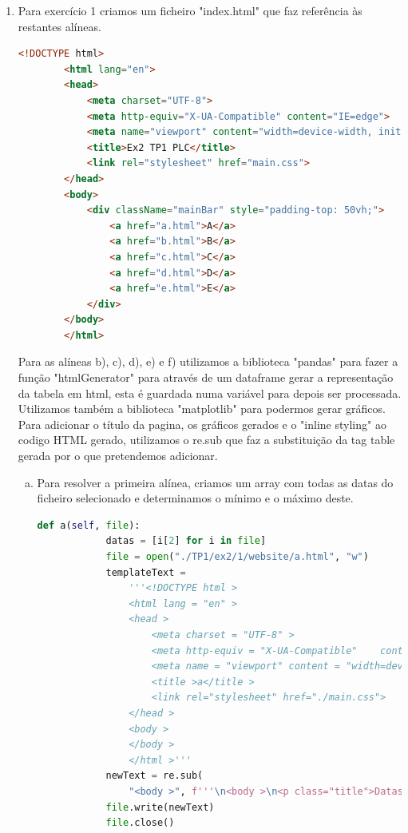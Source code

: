 \documentclass[11pt,a4paper]{report}%
\begin{document}
\begin{enumerate}
	\item Para exercício 1 criamos um ficheiro "index.html" que faz referência às restantes alíneas.\\
	\begin{lstlisting}[language=html]
		<!DOCTYPE html>
		<html lang="en">
		<head>
			<meta charset="UTF-8">
			<meta http-equiv="X-UA-Compatible" content="IE=edge">
			<meta name="viewport" content="width=device-width, initial-scale=1.0">
			<title>Ex2 TP1 PLC</title>
			<link rel="stylesheet" href="main.css">
		</head>
		<body>
			<div className="mainBar" style="padding-top: 50vh;">
				<a href="a.html">A</a>
				<a href="b.html">B</a>
				<a href="c.html">C</a>
				<a href="d.html">D</a>
				<a href="e.html">E</a>
			</div>
		</body>
		</html>
	\end{lstlisting}
	Para as alíneas b), c), d), e) e f) utilizamos a biblioteca "pandas" para fazer a função "htmlGenerator" para através de um dataframe gerar a representação da tabela em html, esta é guardada numa variável para depois ser processada.\\
	Utilizamos também a biblioteca "matplotlib" para podermos gerar gráficos.\\
	Para adicionar o título da pagina, os gráficos gerados e o "inline styling" ao codigo HTML gerado, utilizamos o re.sub que faz a substituição da tag table gerada por o que pretendemos adicionar.
		
	\newpage
	
	\begin{enumerate}[a)]
		\item Para resolver a primeira alínea, criamos um array com todas as datas do ficheiro selecionado e determinamos o mínimo e o máximo deste.\\
		\begin{lstlisting}[language=python]
		def a(self, file):
			datas = [i[2] for i in file]
			file = open("./TP1/ex2/1/website/a.html", "w")
			templateText = 
				'''<!DOCTYPE html >
				<html lang = "en" >
				<head >
					<meta charset = "UTF-8" >
					<meta http-equiv = "X-UA-Compatible" 	content = "IE=edge" >
					<meta name = "viewport" content = "width=device-width, initial-scale=1.0" >
					<title >a</title >
					<link rel="stylesheet" href="./main.css">
				</head >
				<body >
				</body >
				</html >'''
			newText = re.sub(
				"<body >", f'''\n<body >\n<p class="title">Datas extremas dos registos no dataset</p>\n<p class="minData">Extremo inferior do dataset: {min(datas)}</p>\n<p class="maxData">Extremo superior do dataset: {max(datas)}</p>''', templateText)
			file.write(newText)
			file.close()
		\end{lstlisting}
	

\end{enumerate}
\end{enumerate}
\end{document}
